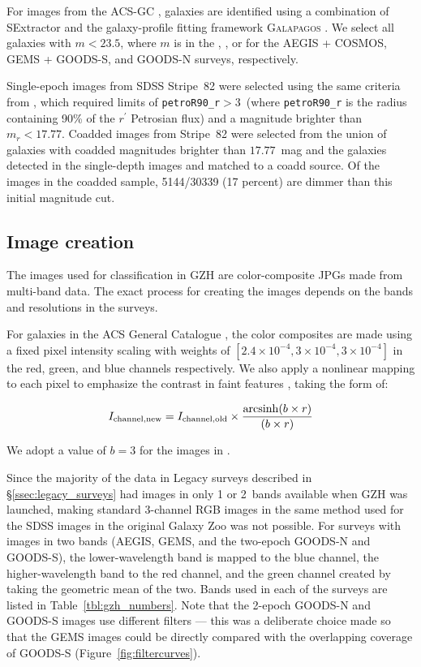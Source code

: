 \documentclass[usenatbib]{mn2e}
\begin{document}
For images from the ACS-GC \citet{gri12}, galaxies are identified using a combination of SExtractor \citep{ber96} and the galaxy-profile fitting framework \textsc{Galapagos} \citep{hau07}. We select all galaxies with $m < 23.5$, where $m$ is in the \Iband, \zband, or \iband{} for the AEGIS + COSMOS, GEMS + GOODS-S, and GOODS-N surveys, respectively. 

Single-epoch images from SDSS Stripe~82 were selected using the same criteria from \citet{wil13}, which required limits of \texttt{petroR90\_r}$ > 3$\arcsec~(where \texttt{petroR90\_r} is the radius containing 90\% of the $r^\prime$ Petrosian flux) and a magnitude brighter than $m_r < 17.77$. Coadded images from Stripe~82 were selected from the union of galaxies with coadded magnitudes brighter than $17.77$~mag and the galaxies detected in the single-depth images and matched to a coadd source. Of the images in the coadded sample, 5144/30339 (17 percent) are dimmer than this initial magnitude cut. 

\subsection{Image creation}

The images used for classification in GZH are color-composite JPGs made from multi-band data. The exact process for creating the images depends on the bands and resolutions in the surveys. 

For galaxies in the ACS General Catalogue \citep[AEGIS, COSMOS, GEMS, 2-epoch GOODS;][]{gri12}, the color composites are made using a fixed pixel intensity scaling with weights of $[2.4\times10^{-4},3\times10^{-4},3\times10^{-4}]$ in the red, green, and blue channels respectively. We also apply a nonlinear mapping to each pixel to emphasize the contrast in faint features \citep{lup04}, taking the form of:

\begin{equation}
I_\mathrm{channel,new} = I_\mathrm{channel,old} \times \frac{\operatorname{arcsinh}(b\times r)}{(b\times r)}
\label{eqn:nonlinear}
\end{equation}

\noindent We adopt a value of $b=3$ for the \hst{} images in \citet{gri12}. 

Since the majority of the data in Legacy surveys described in \S\ref{ssec:legacy_surveys} had images in only 1 or 2~bands available when GZH was launched, making standard 3-channel RGB images in the same method used for the SDSS images in the original Galaxy Zoo was not possible. For surveys with images in two bands (AEGIS, GEMS, and the two-epoch GOODS-N and GOODS-S), the lower-wavelength band is mapped to the blue channel, the higher-wavelength band to the red channel, and the green channel created by taking the geometric mean of the two. Bands used in each of the surveys are listed in Table~\ref{tbl:gzh_numbers}. Note that the 2-epoch GOODS-N and GOODS-S images use different filters --- this was a deliberate choice made so that the GEMS images could be directly compared with the overlapping coverage of GOODS-S (Figure~\ref{fig:filtercurves}). 
\end{document}
